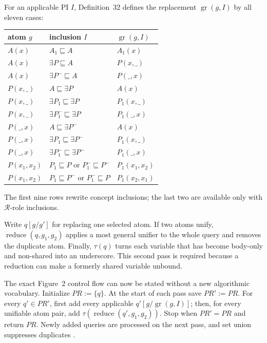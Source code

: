 For an applicable PI \(I\), Definition~32 defines the replacement
\(\operatorname{gr}(g,I)\) by all eleven cases:
\begin{center}
\scriptsize
\begin{tabularx}{\textwidth}{@{}X X X@{}}
\toprule
atom \(g\) & inclusion \(I\) & \(\operatorname{gr}(g,I)\)\\
\midrule
\(A(x)\) & \(A_1\sqsubseteq A\) & \(A_1(x)\)\\
\(A(x)\) & \(\exists P\sqsubseteq A\) & \(P(x,\_)\)\\
\(A(x)\) & \(\exists P^{-}\sqsubseteq A\) & \(P(\_,x)\)\\
\(P(x,\_)\) & \(A\sqsubseteq\exists P\) & \(A(x)\)\\
\(P(x,\_)\) & \(\exists P_1\sqsubseteq\exists P\) & \(P_1(x,\_)\)\\
\(P(x,\_)\) & \(\exists P_1^{-}\sqsubseteq\exists P\) & \(P_1(\_,x)\)\\
\(P(\_,x)\) & \(A\sqsubseteq\exists P^{-}\) & \(A(x)\)\\
\(P(\_,x)\) & \(\exists P_1\sqsubseteq\exists P^{-}\) & \(P_1(x,\_)\)\\
\(P(\_,x)\) & \(\exists P_1^{-}\sqsubseteq\exists P^{-}\) & \(P_1(\_,x)\)\\
\(P(x_1,x_2)\) & \(P_1\sqsubseteq P\) or \(P_1^{-}\sqsubseteq P^{-}\) &
\(P_1(x_1,x_2)\)\\
\(P(x_1,x_2)\) & \(P_1\sqsubseteq P^{-}\) or \(P_1^{-}\sqsubseteq P\) &
\(P_1(x_2,x_1)\)\\
\bottomrule
\end{tabularx}
\end{center}
The first nine rows rewrite concept inclusions; the last two are available only
with \(\mathcal R\)-role inclusions.

Write \(q[g/g']\) for replacing one selected atom.  If two atoms unify,
\(\operatorname{reduce}(q,g_1,g_2)\) applies a most general unifier to the whole
query and removes the duplicate atom.  Finally, \(\tau(q)\) turns each variable
that has become body-only and non-shared into an underscore.  This second pass
is required because a reduction can make a formerly shared variable unbound.

The exact Figure~2 control flow can now be stated without a new algorithmic
vocabulary.  Initialize \(PR:=\{q\}\).  At the start of each pass save
\(PR':=PR\).  For every \(q'\in PR'\), first add every applicable
\(q'[g/\operatorname{gr}(g,I)]\); then, for every unifiable atom pair, add
\(\tau(\operatorname{reduce}(q',g_1,g_2))\).  Stop when \(PR'=PR\) and return
\(PR\).  Newly added queries are processed on the next pass, and set union
suppresses duplicates \cite[def.~32 and fig.~2]{CalvaneseEtAl2007}.

